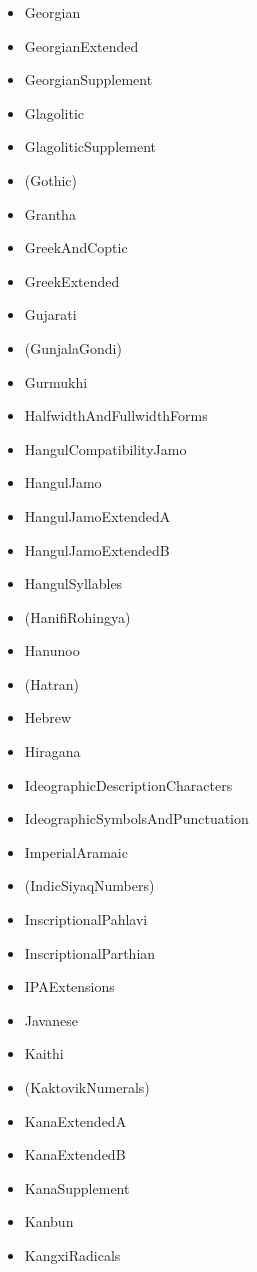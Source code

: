 \documentclass{article}
\newenvironment{itemlist}{%
  \begin{itemize}
  \setlength{\itemsep}{0pt}
  \setlength{\parsep}{0pt}
  \setlength{\topsep}{0pt}
  \setlength{\partopsep}{0pt}
  \setlength{\parskip}{0pt}
  \setlength{\labelsep}{5pt}}%
{
  \end{itemize}}
\begin{document}
\begin{multicols*}{2}
\begin{itemlist}
        \item Georgian
        \item GeorgianExtended
        \item GeorgianSupplement
        \item Glagolitic
        \item GlagoliticSupplement
        \item (Gothic)
        \item Grantha
        \item GreekAndCoptic
        \item GreekExtended
        \item Gujarati
        \item (GunjalaGondi)
        \item Gurmukhi
        \item HalfwidthAndFullwidthForms
        \item HangulCompatibilityJamo
        \item HangulJamo
        \item HangulJamoExtendedA
        \item HangulJamoExtendedB
        \item HangulSyllables
        \item (HanifiRohingya)
        \item Hanunoo
        \item (Hatran)
        \item Hebrew
        \item Hiragana
        \item IdeographicDescriptionCharacters
        \item IdeographicSymbolsAndPunctuation
        \item ImperialAramaic
        \item (IndicSiyaqNumbers)
        \item InscriptionalPahlavi
        \item InscriptionalParthian
        \item IPAExtensions
        \item Javanese
        \item Kaithi
        \item (KaktovikNumerals)
        \item KanaExtendedA
        \item KanaExtendedB
        \item KanaSupplement
        \item Kanbun
        \item KangxiRadicals

\end{itemlist}
\end{multicols*}
\end{document}
